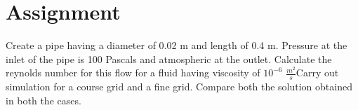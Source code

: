 \section{Assignment}

Create a pipe having a diameter of 0.02 m and length of 0.4 m. Pressure at the inlet of the pipe is 100 Pascals and atmospheric at the outlet. Calculate the reynolds number for this flow for a fluid having viscosity of $10^{-6}$ $\frac{m^2}{s}$Carry out simulation for a course grid and a fine grid. Compare both the solution obtained in both the cases. 